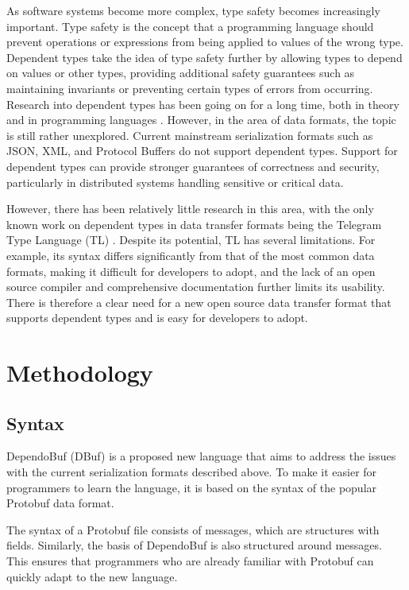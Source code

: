 \documentclass[conference]{IEEEtran}
\begin{document}
As software systems become more complex, type safety becomes increasingly important. Type safety is the concept that a programming language should prevent operations or expressions from being applied to values of the wrong type. Dependent types take the idea of type safety further by allowing types to depend on values or other types, providing additional safety guarantees such as maintaining invariants or preventing certain types of errors from occurring. Research into dependent types has been going on for a long time, both in theory \cite{types} and in programming languages \cite{pr}. However, in the area of data formats, the topic is still rather unexplored. Current mainstream serialization formats such as JSON, XML, and Protocol Buffers do not support dependent types. Support for dependent types can provide stronger guarantees of correctness and security, particularly in distributed systems handling sensitive or critical data.

However, there has been relatively little research in this area, with the only known work on dependent types in data transfer formats being the Telegram Type Language (TL) \cite{tl}. Despite its potential, TL has several limitations. For example, its syntax differs significantly from that of the most common data formats, making it difficult for developers to adopt, and the lack of an open source compiler and comprehensive documentation further limits its usability. There is therefore a clear need for a new open source data transfer format that supports dependent types and is easy for developers to adopt.

\section{Methodology}
\subsection{Syntax}
DependoBuf (DBuf) is a proposed new language that aims to address the issues with the current serialization formats described above. To make it easier for programmers to learn the language, it is based on the syntax of the popular Protobuf data format.

    The syntax of a Protobuf file consists of messages, which are structures with fields. Similarly, the basis of DependoBuf is also structured around messages. This ensures that programmers who are already familiar with Protobuf can quickly adapt to the new language.
\end{document}
